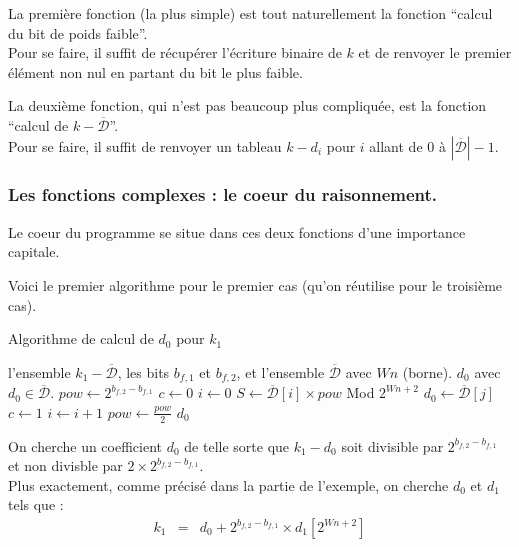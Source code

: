 \documentclass[12pt, a4paper]{memoir}
\newcommand{\dbarre}{\overline{\mathcal{D}}}
\begin{document}
La première fonction (la plus simple) est tout naturellement la fonction ``calcul du bit de poids faible''. \\
Pour se faire, il suffit de récupérer l'écriture binaire de $k$ et de renvoyer le premier élément non nul en 
partant du bit le plus faible.

La deuxième fonction, qui n'est pas beaucoup plus compliquée, est la fonction ``calcul de $k - \dbarre$''. \\
Pour se faire, il suffit de renvoyer un tableau $k - d_i$ pour $i$ allant de $0$ à $|\dbarre| - 1$.

\subsubsection{Les fonctions complexes : le coeur du raisonnement.}

Le coeur du programme se situe dans ces deux fonctions d'une importance capitale.

Voici le premier algorithme pour le premier cas (qu'on réutilise pour le troisième cas).
\begin{algorithm}
 \caption{Algorithme de calcul de $d_0$ pour $k_1$}
 \begin{algorithmic}
  \REQUIRE l'ensemble $k_1 - \dbarre$, les bits $b_{f,1}$ et $b_{f,2}$, et l'ensemble $\dbarre$ avec $Wn$ (borne).
  \ENSURE $d_0$ avec $d_0 \in \dbarre$.
  \STATE $pow \leftarrow 2^{b_{f,2} - b_{f,1}}$
  \STATE $c \leftarrow 0$
  \STATE $i \leftarrow 0$
  \WHILE{$i < |\dbarre|$ et $c = 0$}
  \STATE $S \leftarrow \dbarre[i] \times pow$ Mod $2^{Wn+2}$
  \IF{$S = k_1 - \dbarre[j]$ pour $0 \leq j < |\dbarre|$}
  \STATE $d_0 \leftarrow \dbarre[j]$
  \STATE $c \leftarrow 1$
  \ENDIF
  \STATE $i \leftarrow i+1$
  \ENDWHILE
  \STATE $pow \leftarrow \frac{pow}{2}$
  \ENDWHILE
  \RETURN $d_0$
 \end{algorithmic}
\end{algorithm}

On cherche un coefficient $d_0$ de telle sorte que $k_1 - d_0$ soit divisible par $2^{b_{f,2} - b_{f,1}}$
et non divisble par $2 \times 2^{b_{f,2} - b_{f,1}}$. \\
Plus exactement, comme précisé dans la partie de l'exemple, on cherche $d_0$ et $d_1$ tels que : \\
  $$\begin{array}{ccc}
k_1 & = & d_0 + 2^{b_{f,2} - b_{f,1}} \times d_1[2^{Wn+2}] \\
 \end{array}$$
\end{document}
